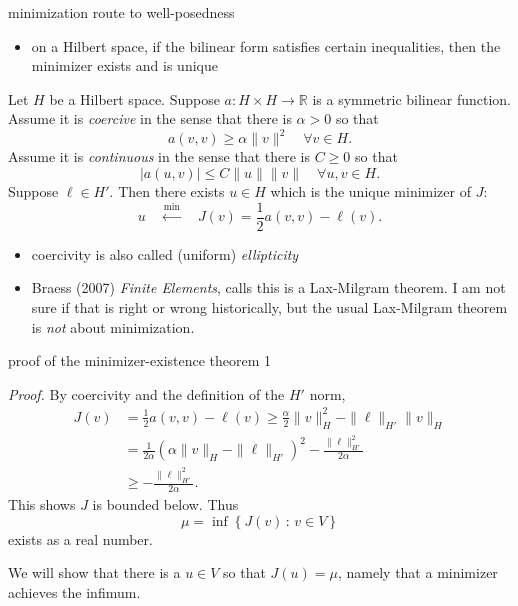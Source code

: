 \documentclass[10pt,
               svgnames,
               hyperref={colorlinks,
                         citecolor=DeepPink4,
                         linkcolor=FireBrick,
                         urlcolor=blue},
               usepdftitle=false]{beamer}
\newcommand{\RR}{\mathbb{R}}
\begin{document}
\begin{frame}{minimization route to well-posedness}

{\footnotesize
\begin{itemize}
\item on a Hilbert space, if the bilinear form satisfies certain inequalities, then the minimizer exists and is unique
\end{itemize}
}

\begin{theorem}
Let $H$ be a Hilbert space.  Suppose $a:H\times H\to \RR$ is a symmetric bilinear function.  Assume it is \alert{\emph{coercive}} in the sense that there is $\alpha>0$ so that
	$$a(v,v) \ge \alpha \|v\|^2 \quad \forall v \in H.$$
Assume it is \alert{\emph{continuous}} in the sense that there is $C\ge 0$ so that
	$$|a(u,v)| \le C \|u\|\|v\| \quad \forall u,v \in H.$$
Suppose $\ell\in H'$.  Then there exists $u\in H$ which is the unique minimizer of $J$:
	$$u \quad \stackrel{\min}{\leftarrow} \quad J(v) = \frac{1}{2} a(v,v) - \ell(v).$$
\end{theorem}

{\footnotesize
\begin{itemize}
\item coercivity is also called (uniform) \alert{\emph{ellipticity}}
\item Braess (2007) \emph{Finite Elements}, calls this is a Lax-Milgram theorem.  I am not sure if that is right or wrong historically, but the usual Lax-Milgram theorem is \emph{not} about minimization.
\end{itemize}
}
\end{frame}


\begin{frame}{proof of the minimizer-existence theorem 1}

\emph{Proof.}  By coercivity and the definition of the $H'$ norm,
\begin{align*}
J(v) &= \frac{1}{2} a(v,v) - \ell(v) \ge \frac{\alpha}{2} \|v\|_H^2 - \|\ell\|_{H'} \|v\|_H \\
&= \frac{1}{2\alpha} \left(\alpha \|v\|_H - \|\ell\|_{H'}\right)^2 - \frac{\|\ell\|_{H'}^2}{2\alpha} \\
&\ge - \frac{\|\ell\|_{H'}^2}{2\alpha}.
\end{align*}
This shows $J$ is bounded below.  Thus
	$$\mu = \inf \left\{J(v)\,:\,v\in V\right\}$$
exists as a real number.

\medskip
We will show that there is a $u\in V$ so that $J(u)=\mu$, namely that a minimizer achieves the infimum.
\end{frame}
\end{document}
